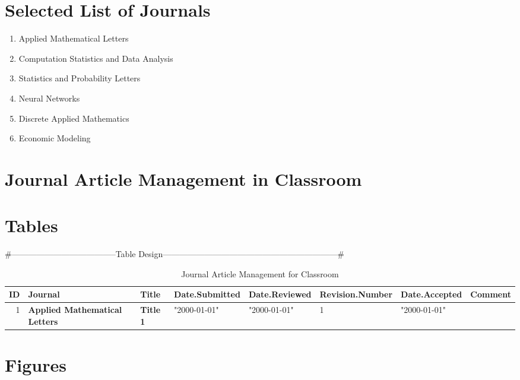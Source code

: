 
\section{Selected List of Journals}

\begin{enumerate}
\item Applied Mathematical Letters \cite{key1}
\item Computation Statistics and Data Analysis \cite{key2}
\item Statistics and Probability Letters \cite{key3}
\item Neural Networks \cite{key4}
\item Discrete Applied Mathematics \cite{key5}
\item Economic Modeling \cite{key6}
\end{enumerate}

\section{Journal Article Management in Classroom}


\section{Tables}
#--------------------------------------Table Design---------------------------------------------------------------#
\begin{table}[ht]
\caption{Journal Article Management for Classroom}
\begin{tabular}{rlllllll}
\hline
ID & Journal & Title & Date.Submitted & Date.Reviewed & Revision.Number & Date.Accepted & Comment \\
\hline
1 & \textbf{Applied Mathematical Letters} \cite{key1} & \textbf{Title 1} & "2000-01-01" & "2000-01-01" & 1 & "2000-01-01" & \\
\hline
\end{tabular}
\end{table}

\section{Figures}


